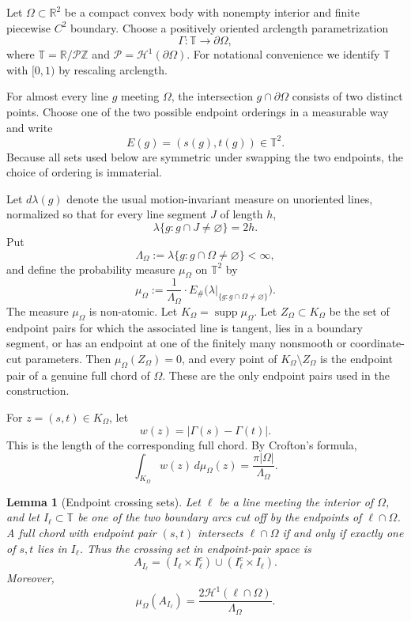 \documentclass[11pt]{article}
\newtheorem{lemma}[theorem]{Lemma}
\theoremstyle{definition}
\newcommand{\R}{\mathbb R}
\newcommand{\Z}{\mathbb Z}
\newcommand{\T}{\mathbb T}
\newcommand{\cH}{\mathcal H}
\newcommand{\supp}{\operatorname{supp}}
\begin{document}
Let $\Omega\subset\R^2$ be a compact convex body with nonempty interior and finite piecewise $C^2$ boundary.  Choose a positively oriented arclength parametrization
\[
        \Gamma:\T\to\partial\Omega,
\]
where $\T=\R/\mathcal P\Z$ and $\mathcal P=\cH^1(\partial\Omega)$.
For notational convenience we identify $\T$ with $[0,1)$ by rescaling arclength.

\bigskip
\noindent
For almost every line $g$ meeting $\Omega$, the intersection $g\cap\partial\Omega$ consists of two distinct points.  Choose one of the two possible endpoint orderings in a measurable way and write
\[
        E(g)=(s(g),t(g))\in\T^2.
\]
Because all sets used below are symmetric under swapping the two endpoints, the choice of ordering is immaterial.

\bigskip
\noindent
Let $d\lambda(g)$ denote the usual motion-invariant measure on unoriented lines, normalized so that for every line segment $J$ of length $h$,
\[
        \lambda\{g:g\cap J\ne\varnothing\}=2h.
\]
Put
\[
        \Lambda_\Omega:=\lambda\{g:g\cap\Omega\ne\varnothing\}<\infty,
\]
and define the probability measure $\mu_\Omega$ on $\T^2$ by
\[
        \mu_\Omega:=\frac1{\Lambda_\Omega}\cdot E_\#\bigl(\lambda|_{\{g:g\cap\Omega\ne\varnothing\}}\bigr).
\]
The measure $\mu_\Omega$ is non-atomic.  Let $K_\Omega=\supp\mu_\Omega$.  Let $Z_\Omega\subset K_\Omega$ be the set of endpoint pairs for which the associated line is tangent, lies in a boundary segment, or has an endpoint at one of the finitely many nonsmooth or coordinate-cut parameters.  Then $\mu_\Omega(Z_\Omega)=0$, and every point of $K_\Omega\setminus Z_\Omega$ is the endpoint pair of a genuine full chord of $\Omega$.  These are the only endpoint pairs used in the construction.

\bigskip
\noindent
For $z=(s,t)\in K_\Omega$, let
\[
        w(z)=|\Gamma(s)-\Gamma(t)|.
\]
This is the length of the corresponding full chord.  By Crofton's formula,
\begin{equation}\label{eq:mean-length}
        \int_{K_\Omega} w(z)\,d\mu_\Omega(z)
        =
        \frac{\pi|\Omega|}{\Lambda_\Omega}.
\end{equation}

\begin{lemma}[Endpoint crossing sets]\label{lem:endpoint-crossing}
Let $\ell$ be a line meeting the interior of $\Omega$, and let $I_\ell\subset\T$ be one of the two boundary arcs cut off by the endpoints of $\ell\cap\Omega$.  A full chord with endpoint pair $(s,t)$ intersects $\ell\cap\Omega$ if and only if exactly one of $s,t$ lies in $I_\ell$.  Thus the crossing set in endpoint-pair space is
\[
        A_{I_\ell}=(I_\ell\times I_\ell^c)\cup(I_\ell^c\times I_\ell).
\]
Moreover,
\begin{equation}\label{eq:mu-crossing}
        \mu_\Omega(A_{I_\ell})
        =
        \frac{2\cH^1(\ell\cap\Omega)}{\Lambda_\Omega}.
\end{equation}
\end{lemma}
\end{document}

